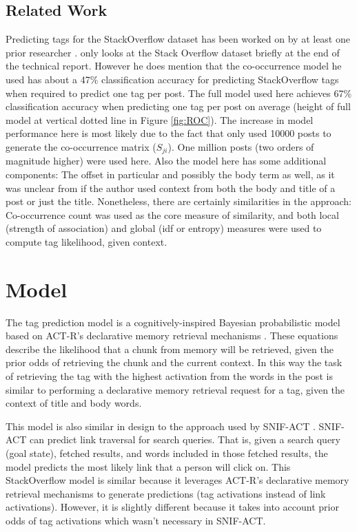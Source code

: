 \documentclass[10pt,letterpaper]{article}
\begin{document}
\subsection{Related Work}
Predicting tags for the StackOverflow dataset has been worked on by at least one prior researcher \cite{Kuo2011}.
 only looks at the Stack Overflow dataset briefly at the end of the technical report.
However he does mention that the co-occurrence model he used has about a 47\% classification accuracy for predicting StackOverflow tags when required to predict one tag per post.
The full model used here achieves 67\% classification accuracy when predicting one tag per post on average
(height of full model at vertical dotted line in Figure \ref{fig:ROC}).
The increase in model performance here is most likely due to the fact that  only used \num{10000} posts to generate the co-occurrence matrix ($S_{ji}$).
One million posts (two orders of magnitude higher) were used here.
Also the model here has some additional components: The offset in particular and possibly the body term as well,
as it was unclear from  if the author used context from both the body and title of a post or just the title. 
Nonetheless, there are certainly similarities in the approach:
Co-occurrence count was used as the core measure of similarity, and both local (strength of association) and global (idf or entropy) measures were used to compute tag likelihood, given context.


\section{Model}

The tag prediction model is a cognitively-inspired Bayesian probabilistic model based on ACT-R's declarative memory retrieval mechanisms \cite{Anderson2004}.
These equations describe the likelihood that a chunk from memory will be retrieved, given the prior odds of retrieving the chunk and the current context.
In this way the task of retrieving the tag with the highest activation from the words in the post is similar to performing a declarative memory retrieval request for a tag, given the context of title and body words.

This model is also similar in design to the approach used by SNIF-ACT \cite{Fu2007, Pirolli2003}. 
SNIF-ACT can predict link traversal for search queries.
That is, given a search query (goal state), fetched results, and words included in those fetched results, the model predicts the most likely link that a person will click on.
This StackOverflow model is similar because it leverages ACT-R's declarative memory retrieval mechanisms to generate predictions (tag activations instead of link activations).
However, it is slightly different because it takes into account prior odds of tag activations which wasn't necessary in SNIF-ACT.
\end{document}
